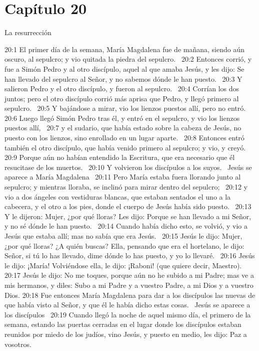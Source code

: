 \section*{Capítulo 20}
La resurrección   

20:1 El primer día de la semana, María Magdalena fue de mañana, siendo aún oscuro, al sepulcro; y vio quitada la piedra del sepulcro.  
20:2 Entonces corrió, y fue a Simón Pedro y al otro discípulo, aquel al que amaba Jesús, y les dijo: Se han llevado del sepulcro al Señor, y no sabemos dónde le han puesto.  
20:3 Y salieron Pedro y el otro discípulo, y fueron al sepulcro.  
20:4 Corrían los dos juntos; pero el otro discípulo corrió más aprisa que Pedro, y llegó primero al sepulcro.  
20:5 Y bajándose a mirar, vio los lienzos puestos allí, pero no entró.  
20:6 Luego llegó Simón Pedro tras él, y entró en el sepulcro, y vio los lienzos puestos allí,  
20:7 y el sudario, que había estado sobre la cabeza de Jesús, no puesto con los lienzos, sino enrollado en un lugar aparte.  
20:8 Entonces entró también el otro discípulo, que había venido primero al sepulcro; y vio, y creyó.  
20:9 Porque aún no habían entendido la Escritura, que era necesario que él resucitase de los muertos.  
20:10 Y volvieron los discípulos a los suyos.  
Jesús se aparece a María Magdalena   
20:11 Pero María estaba fuera llorando junto al sepulcro; y mientras lloraba, se inclinó para mirar dentro del sepulcro;  
20:12 y vio a dos ángeles con vestiduras blancas, que estaban sentados el uno a la cabecera, y el otro a los pies, donde el cuerpo de Jesús había sido puesto.  
20:13 Y le dijeron: Mujer, ¿por qué lloras? Les dijo: Porque se han llevado a mi Señor, y no sé dónde le han puesto.  
20:14 Cuando había dicho esto, se volvió, y vio a Jesús que estaba allí; mas no sabía que era Jesús.  
20:15 Jesús le dijo: Mujer, ¿por qué lloras? ¿A quién buscas? Ella, pensando que era el hortelano, le dijo: Señor, si tú lo has llevado, dime dónde lo has puesto, y yo lo llevaré.  
20:16 Jesús le dijo: ¡María! Volviéndose ella, le dijo: ¡Raboni! (que quiere decir, Maestro).  
20:17 Jesús le dijo: No me toques, porque aún no he subido a mi Padre; mas ve a mis hermanos, y diles: Subo a mi Padre y a vuestro Padre, a mi Dios y a vuestro Dios. 
20:18 Fue entonces María Magdalena para dar a los discípulos las nuevas de que había visto al Señor, y que él le había dicho estas cosas.  
Jesús se aparece a los discípulos   
20:19 Cuando llegó la noche de aquel mismo día, el primero de la semana, estando las puertas cerradas en el lugar donde los discípulos estaban reunidos por miedo de los judíos, vino Jesús, y puesto en medio, les dijo: Paz a vosotros. 
